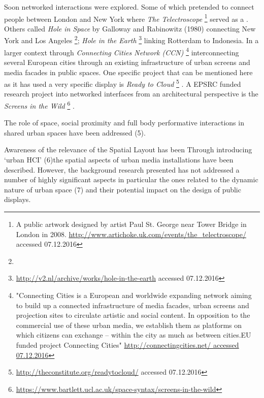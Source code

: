 Soon networked interactions were explored. 
Some of which pretended to connect people between London and New York where  \textit{The Telectroscope} \footnote{A public artwork designed by artist Paul St. George near Tower Bridge in London in 2008. \url{http://www.artichoke.uk.com/events/the_telectroscope/} accessed 07.12.2016} served as a . Others called \textit{Hole in Space} by Galloway and Rabinowitz (1980)  connecting New York and Los Angeles \footnote{}; \textit{Hole in the Earth}  \footnote{\url{http://v2.nl/archive/works/hole-in-the-earth} accessed 07.12.2016} linking Rotterdam to Indonesia.
In a larger context through  \textit{Connecting Cities Network (CCN)} \footnote{"Connecting Cities is a European and worldwide expanding network aiming to build up a connected infrastructure of media facades, urban screens and projection sites to circulate artistic and social content. 
In opposition to the commercial use of these urban media, we establish them as platforms on which citizens can exchange – within the city as much as between cities.EU funded project Connecting Cities" \url{http://connectingcities.net/ accessed 07.12.2016}} interconnecting several European cities through an existing infrastructure of urban screens and media facades in public spaces.
One specific project that can be mentioned here as it has used a very specific display is \textit{Ready to Cloud} \footnote{\url{http://theconstitute.org/readytocloud/} accessed 07.12.2016} . 
A EPSRC funded research project into networked interfaces from an architectural perspective is the \textit{Screens in the Wild} \footnote{\url{https://www.bartlett.ucl.ac.uk/space-syntax/screens-in-the-wild}} .


The role of space, social proximity and full body performative interactions in shared urban spaces have been addressed (5). 

Awareness of the relevance of the Spatial Layout has been 
Through introducing ‘urban HCI’  (6)the spatial aspects of urban media installations have been described. 
However, the background research presented has not addressed a number of highly significant aspects in particular the ones related to the dynamic nature of urban space (7) and their potential impact on the design of public displays. 

